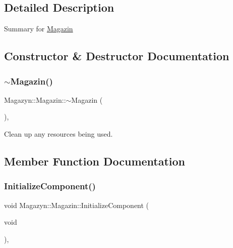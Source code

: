 \subsection{Detailed Description}
Summary for \hyperlink{class_magazyn_1_1_magazin}{Magazin} 



\subsection{Constructor \& Destructor Documentation}
\hypertarget{class_magazyn_1_1_magazin_a3d5a3139a7bce989a8cff474eaa311d6}{}\label{class_magazyn_1_1_magazin_a3d5a3139a7bce989a8cff474eaa311d6} 
\subsubsection{\texorpdfstring{$\sim$\+Magazin()}{~Magazin()}}
{\footnotesize\ttfamily Magazyn\+::\+Magazin\+::$\sim$\+Magazin (\begin{DoxyParamCaption}{ }\end{DoxyParamCaption})\hspace{0.3cm}{\ttfamily [inline]}, {\ttfamily [protected]}}



Clean up any resources being used. 



\subsection{Member Function Documentation}
\hypertarget{class_magazyn_1_1_magazin_a99d47c14fc619cce7d7b5a9ca5c2ebe3}{}\label{class_magazyn_1_1_magazin_a99d47c14fc619cce7d7b5a9ca5c2ebe3} 
\subsubsection{\texorpdfstring{Initialize\+Component()}{InitializeComponent()}}
{\footnotesize\ttfamily void Magazyn\+::\+Magazin\+::\+Initialize\+Component (\begin{DoxyParamCaption}\item[{void}]{ }\end{DoxyParamCaption})\hspace{0.3cm}{\ttfamily [inline]}, {\ttfamily [private]}}



